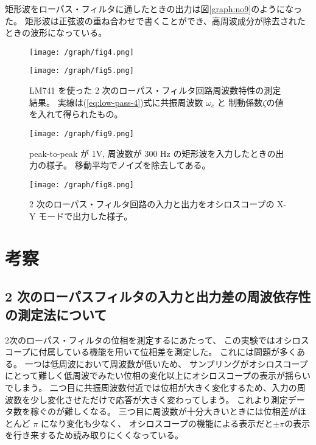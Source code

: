 \documentclass[11pt,dvipdfmx,a4paper]{jsarticle}
\begin{document}
矩形波をローパス・フィルタに通したときの出力は図\ref{graph:no9}のようになった。
矩形波は正弦波の重ね合わせで書くことができ、高周波成分が除去されたときの波形になっている。
\begin{figure}[H]
	\centering
	\begin{minipage}[t]{0.49\columnwidth}
		\centering
		\texttt{[image: /graph/fig4.png]}
		\label{graph:no4}
	\end{minipage}
	\hfill
	\begin{minipage}[t]{0.49\columnwidth}
		\centering
		\texttt{[image: /graph/fig5.png]}
		\label{graph:no5}
	\end{minipage}
	\caption{LM741 を使った 2 次のローパス・フィルタ回路周波数特性の測定結果。
	実線は(\ref{eq:low-pass-4})式に共振周波数 \(\omega_c\) と 制動係数\(\zeta\)の値を入れて得られたもの。}
\end{figure}

\begin{figure}[H]
	\centering
	\begin{minipage}[t]{0.55\columnwidth}
		\centering
		\texttt{[image: /graph/fig9.png]}
		\caption{peak-to-peak が 1V, 周波数が 300 Hz の矩形波を入力したときの出力の様子。
		移動平均でノイズを除去してある。}
		\label{graph:no9}
	\end{minipage}
	\hfill
	\begin{minipage}[t]{0.42\columnwidth}
		\centering
		\texttt{[image: /graph/fig8.png]}
		\caption{2 次のローパス・フィルタ回路の入力と出力をオシロスコープの X-Y モードで出力した様子。}
		\label{graph:no8}
	\end{minipage}
\end{figure}

\section{考察}
\subsection{2 次のローパスフィルタの入力と出力差の周波依存性の測定法について}
2次のローパス・フィルタの位相を測定するにあたって、
この実験ではオシロスコープに付属している機能を用いて位相差を測定した。
これには問題が多くある。
一つは低周波において周波数が低いため、
サンプリングがオシロスコープにとって難しく低周波でみたい位相の変化以上にオシロスコープの表示が揺らいでしまう。
二つ目に共振周波数付近では位相が大きく変化するため、入力の周波数を少し変化させただけで応答が大きく変わってしまう。
これより測定データ数を稼ぐのが難しくなる。
三つ目に周波数が十分大きいときには位相差がほとんど \(\pi\) になり変化も少なく、
オシロスコープの機能による表示だと\(\pm\pi\)の表示を行き来するため読み取りにくくなっている。
\end{document}
